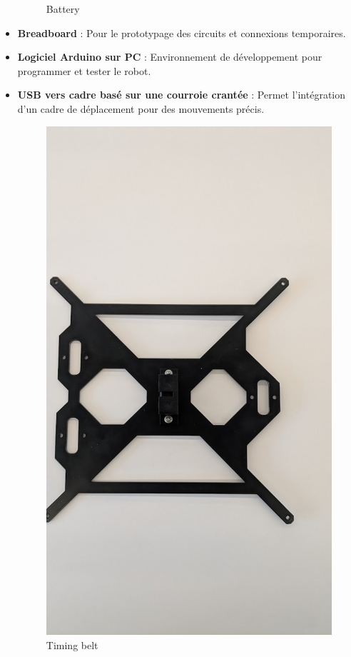 \documentclass[a4paper,12pt]{article}
\begin{document}
\begin{itemize}
\begin{figure}
        \caption{Battery}
        \label{fig:enter-label}
    \end{figure}
    \item \textbf{Breadboard} : Pour le prototypage des circuits et connexions temporaires.
    \item \textbf{Logiciel Arduino sur PC} : Environnement de développement pour programmer et tester le robot.
    \item \textbf{USB vers cadre basé sur une courroie crantée} : Permet l'intégration d'un cadre de déplacement pour des mouvements précis.
    \begin{figure}
        \centering
        \includegraphics[width=0.5\linewidth]{image.png}
        \caption{Timing belt}
        \label{fig:enter-label}
    \end{figure}
\end{itemize}
\end{document}
